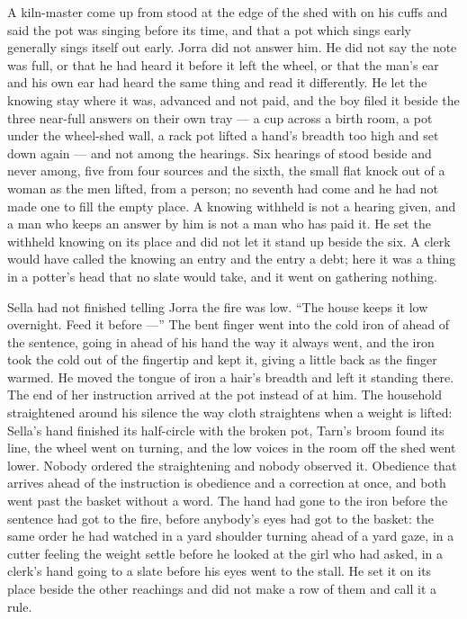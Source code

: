 A kiln-master come up from  stood at the edge of the shed with  on his cuffs and said the pot was singing before its time, and that a pot which sings early generally sings itself out early. Jorra did not answer him. He did not say the note was full, or that he had heard it before it left the wheel, or that the man's ear and his own ear had heard the same thing and read it differently. He let the knowing stay where it was, advanced and not paid, and the boy filed it beside the three near-full answers on their own tray --- a cup across a birth room, a pot under the wheel-shed wall, a rack pot lifted a hand's breadth too high and set down again --- and not among the hearings. Six hearings of  stood beside and never among, five from four sources and the sixth, the small flat knock out of a woman as the men lifted, from a person; no seventh had come and he had not made one to fill the empty place. A knowing withheld is not a hearing given, and a man who keeps an answer by him is not a man who has paid it. He set the withheld knowing on its place and did not let it stand up beside the six. A clerk would have called the knowing an entry and the entry a debt; here it was a thing in a potter's head that no slate would take, and it went on gathering nothing.

\scenebreak

Sella had not finished telling Jorra the fire was low. “The house keeps it low overnight. Feed it before ---” The bent finger went into the cold iron of  ahead of the sentence, going in ahead of his hand the way it always went, and the iron took the cold out of the fingertip and kept it, giving a little back as the finger warmed. He moved the tongue of iron a hair's breadth and left it standing there. The end of her instruction arrived at the pot instead of at him. The household straightened around his silence the way cloth straightens when a weight is lifted: Sella's hand finished its half-circle with the broken pot, Tarn's broom found its line, the wheel went on turning, and the low voices in the room off the shed went lower. Nobody ordered the straightening and nobody observed it. Obedience that arrives ahead of the instruction is obedience and a correction at once, and both went past the basket without a word. The hand had gone to the iron before the sentence had got to the fire, before anybody's eyes had got to the basket: the same order he had watched in a yard shoulder turning ahead of a yard gaze, in a cutter feeling the weight settle before he looked at the girl who had asked, in a clerk's hand going to a slate before his eyes went to the stall. He set it on its place beside the other reachings and did not make a row of them and call it a rule.

